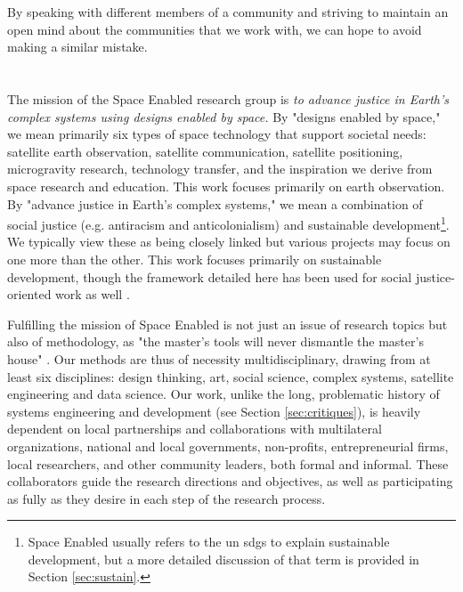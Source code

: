 By speaking with different members of a community and striving to maintain an open mind about the communities that we work with, we can hope to avoid making a similar mistake.

\section{}

The mission of the Space Enabled research group is \textit{to advance justice in Earth's complex systems using designs enabled by space.} By "designs enabled by space," we mean primarily six types of space technology that support societal needs: satellite earth observation, satellite communication, satellite positioning, microgravity research, technology transfer, and the inspiration we derive from space research and education. This work focuses primarily on earth observation. By "advance justice in Earth's complex systems," we mean a combination of social justice (e.g. antiracism and anticolonialism) and sustainable development\footnote{Space Enabled usually refers to the \ac{un} \acp{sdg} to explain sustainable development, but a more detailed discussion of that term is provided in Section \ref{sec:sustain}.}. We typically view these as being closely linked but various projects may focus on one more than the other. This work focuses primarily on sustainable development, though the framework detailed here has been used for social justice-oriented work as well \cite{ovienmhadaEnvironmentVulnerabilityDecisionTechnologyModelingFramework2021}. 

Fulfilling the mission of Space Enabled is not just an issue of research topics but also of methodology, as "the master's tools will never dismantle the master's house" \cite{lordeMasterToolsWill1984}. Our methods are thus of necessity multidisciplinary, drawing from at least six disciplines: design thinking, art, social science, complex systems, satellite engineering and data science. Our work, unlike the long, problematic history of systems engineering and development (see Section \ref{sec:critiques}), is heavily dependent on local partnerships and collaborations with multilateral organizations, national and local governments, non-profits, entrepreneurial firms, local researchers, and other community leaders, both formal and informal. These collaborators guide the research directions and objectives, as well as participating as fully as they desire in each step of the research process.

